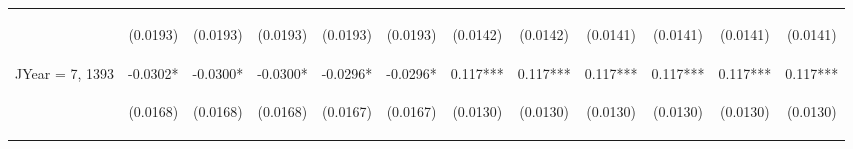 \documentclass[]{article}
\begin{document}
\begin{center}
\begin{tabular}{lccccccccccc}
\vspace{4pt} & \begin{footnotesize}(0.0193)\end{footnotesize} & \begin{footnotesize}(0.0193)\end{footnotesize} & \begin{footnotesize}(0.0193)\end{footnotesize} & \begin{footnotesize}(0.0193)\end{footnotesize} & \begin{footnotesize}(0.0193)\end{footnotesize} & \begin{footnotesize}(0.0142)\end{footnotesize} & \begin{footnotesize}(0.0142)\end{footnotesize} & \begin{footnotesize}(0.0141)\end{footnotesize} & \begin{footnotesize}(0.0141)\end{footnotesize} & \begin{footnotesize}(0.0141)\end{footnotesize} & \begin{footnotesize}(0.0141)\end{footnotesize} \\
JYear = 7, 1393 & -0.0302* & -0.0300* & -0.0300* & -0.0296* & -0.0296* & 0.117*** & 0.117*** & 0.117*** & 0.117*** & 0.117*** & 0.117*** \\
\vspace{4pt} & \begin{footnotesize}(0.0168)\end{footnotesize} & \begin{footnotesize}(0.0168)\end{footnotesize} & \begin{footnotesize}(0.0168)\end{footnotesize} & \begin{footnotesize}(0.0167)\end{footnotesize} & \begin{footnotesize}(0.0167)\end{footnotesize} & \begin{footnotesize}(0.0130)\end{footnotesize} & \begin{footnotesize}(0.0130)\end{footnotesize} & \begin{footnotesize}(0.0130)\end{footnotesize} & \begin{footnotesize}(0.0130)\end{footnotesize} & \begin{footnotesize}(0.0130)\end{footnotesize} & \begin{footnotesize}(0.0130)\end{footnotesize} \\

\end{tabular}
\end{center}
\end{document}
